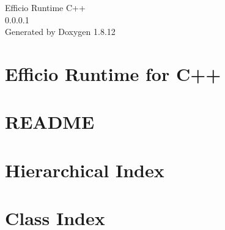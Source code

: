 \documentclass[twoside]{book}
\newcommand{\+}{\discretionary{\mbox{\scriptsize$\hookleftarrow$}}{}{}}
\newcommand{\clearemptydoublepage}{%
  \newpage{\pagestyle{empty}\cleardoublepage}%
}
\begin{document}
\hypersetup{pageanchor=false,
             bookmarksnumbered=true,
             pdfencoding=unicode
            }
\begin{titlepage}
\vspace*{7cm}
\begin{center}%
{\Large Efficio Runtime C++ \\[1ex]\large 0.\+0.\+0.\+1 }\\
\vspace*{1cm}
{\large Generated by Doxygen 1.8.12}\\
\end{center}
\end{titlepage}
\clearemptydoublepage
{}
\tableofcontents
\clearemptydoublepage
{}
\hypersetup{pageanchor=true}

\chapter{Efficio Runtime for C++}
\label{index}\hypertarget{index}{}
\chapter{R\+E\+A\+D\+ME}
\label{md__r_e_a_d_m_e}
\hypertarget{md__r_e_a_d_m_e}{}

\chapter{Hierarchical Index}

\chapter{Class Index}

\end{document}
